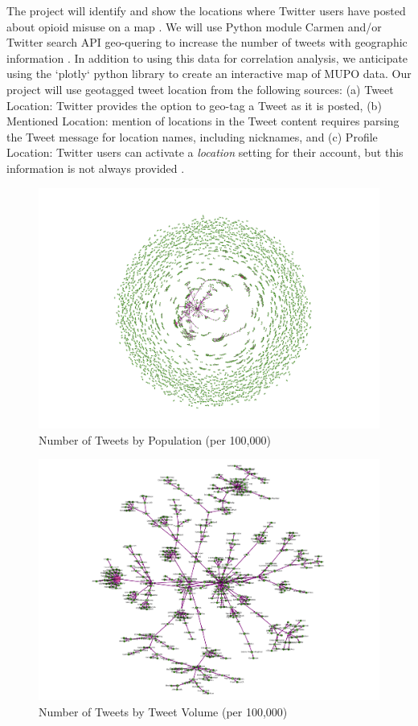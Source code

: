 \documentclass[sigconf]{acmart}
\begin{document}
The project will identify and show the locations where Twitter users have 
posted about opioid misuse on a map \cite{twittergeo}. We will use Python 
module Carmen and/or Twitter search API geo-quering to increase the number of 
tweets with geographic information \cite{dredze13}. In addition to using this 
data for correlation analysis, we anticipate using the `plotly` python library 
to create an interactive map of MUPO data. Our project will use geotagged tweet 
location from the following sources: (a) Tweet Location: Twitter provides the 
option to geo-tag a Tweet as it is posted, (b) Mentioned Location: mention of 
locations in the Tweet content requires parsing the Tweet message for location 
names, including nicknames, and (c) Profile Location: Twitter users can 
activate a \emph{location} setting for their account, but this information 
is not always provided \cite{widener14}. 

\begin{figure}[!ht]
  \centering\includegraphics[width=\columnwidth]{images/Figure1.pdf}
  \caption{Number of Tweets by Population (per 100,000)}
  \label{f:Figure1}
\end{figure}

\begin{figure}[!ht]
  \centering\includegraphics[width=\columnwidth]{images/Figure2.pdf}
  \caption{Number of Tweets by Tweet Volume (per 100,000)}
  \label{f:Figure2}
\end{figure}
\end{document}
